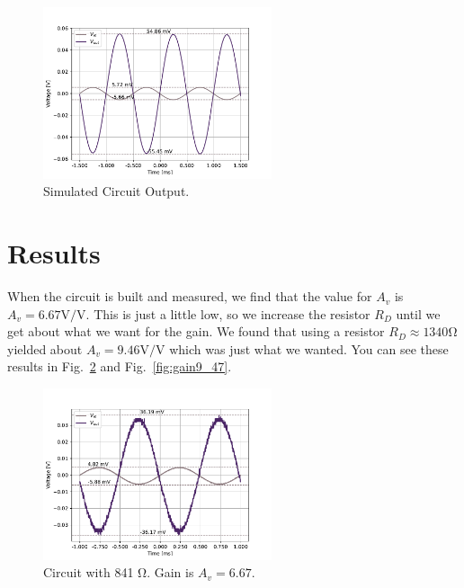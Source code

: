 \documentclass{../../ece-report}
\begin{document}
\begin{figure}[h!]
  \centering
  \includegraphics[width=0.6\textwidth]{../plots/pdf/sim.pdf}
  \caption{Simulated Circuit Output.}\label{fig:sim}
\end{figure}



\section{Results}

When the circuit is built and measured, we find that
the value for $A_v$ is $A_v = 6.67 \si{\V/\V}$. This
is just a little low, so we increase the resistor $R_D$
until we get about what we want for the gain. We found
that using a resistor $R_D \approx 1340 \si{\ohm}$ yielded
about $A_v = 9.46 \si{\V/\V}$ which was just what we
wanted. You can see these results in Fig.~\ref{fig:gain6_67}
and Fig.~\ref{fig:gain9_47}.



\begin{figure}[h!]
  \centering
  \includegraphics[width=0.6\textwidth]{../plots/pdf/gain6_67.pdf}
  \caption{Circuit with 841 \si{\ohm}. Gain is $A_v=6.67$.}\label{fig:gain6_67}
\end{figure}
\end{document}
